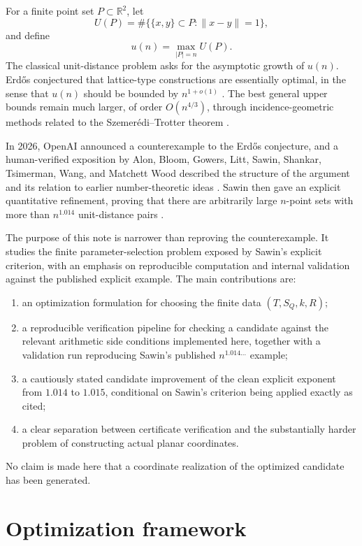 \documentclass[a4paper,12pt]{article}
\begin{document}
For a finite point set $P\subset\mathbb{R}^2$, let
\[
  U(P)=\#\bigl\{\{x,y\}\subset P:\|x-y\|=1\bigr\},
\]
and define
\[
  u(n)=\max_{|P|=n} U(P).
\]
The classical unit-distance problem asks for the asymptotic growth of $u(n)$.  Erd\H{o}s conjectured that lattice-type constructions are essentially optimal, in the sense that $u(n)$ should be bounded by $n^{1+o(1)}$ \cite{Erdos1946,OpenAI2026}.  The best general upper bounds remain much larger, of order $O(n^{4/3})$, through incidence-geometric methods related to the Szemer\'edi--Trotter theorem \cite{ST1983,SST1984}.

In 2026, OpenAI announced a counterexample to the Erd\H{o}s conjecture, and a human-verified exposition by Alon, Bloom, Gowers, Litt, Sawin, Shankar, Tsimerman, Wang, and Matchett Wood described the structure of the argument and its relation to earlier number-theoretic ideas \cite{OpenAI2026,AlonEtAl2026}.  Sawin then gave an explicit quantitative refinement, proving that there are arbitrarily large $n$-point sets with more than $n^{1.014}$ unit-distance pairs \cite{Sawin2026}.

The purpose of this note is narrower than reproving the counterexample.  It studies the finite parameter-selection problem exposed by Sawin's explicit criterion, with an emphasis on reproducible computation and internal validation against the published explicit example.  The main contributions are:
\begin{enumerate}
  \item an optimization formulation for choosing the finite data $(T,S_Q,k,R)$;
  \item a reproducible verification pipeline for checking a candidate against the relevant arithmetic side conditions implemented here, together with a validation run reproducing Sawin's published $n^{1.014\ldots}$ example;
  \item a cautiously stated candidate improvement of the clean explicit exponent from $1.014$ to $1.015$, conditional on Sawin's criterion being applied exactly as cited;
  \item a clear separation between certificate verification and the substantially harder problem of constructing actual planar coordinates.
\end{enumerate}
No claim is made here that a coordinate realization of the optimized candidate has been generated.

\section{Optimization framework}
\end{document}
